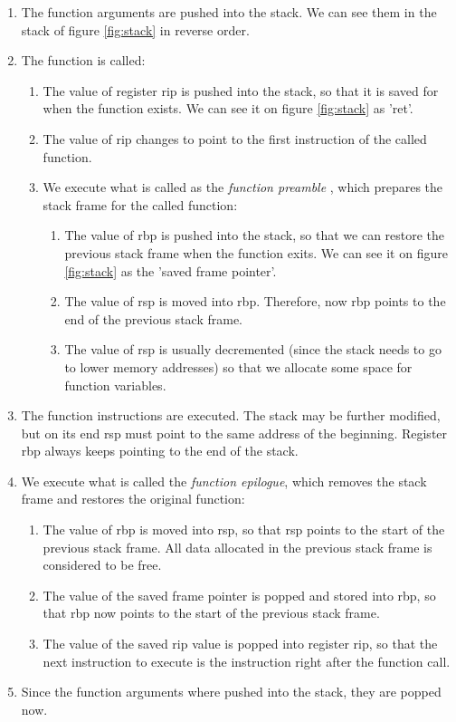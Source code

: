 \begin{enumerate}
\item The function arguments are pushed into the stack. We can see them in the stack of figure \ref{fig:stack} in reverse order. 
\item The function is called:
\begin{enumerate}
	\item The value of register rip is pushed into the stack, so that it is saved for when the function exists. We can see it on figure \ref{fig:stack} as 'ret'.
	\item The value of rip changes to point to the first instruction of the called function.
\item We execute what is called as the \textit{function preamble} \cite{8664_params_abi_p18}, which prepares the stack frame for the called function:
\begin{enumerate}
	\item The value of rbp is pushed into the stack, so that we can restore the previous stack frame when the function exits. We can see it on figure \ref{fig:stack} as the 'saved frame pointer'.
	\item The value of rsp is moved into rbp. Therefore, now rbp points to the end of the previous stack frame.
	\item The value of rsp is usually decremented (since the stack needs to go to lower memory addresses) so that we allocate some space for function variables.
\end{enumerate}
\end{enumerate}
\item The function instructions are executed. The stack may be further modified, but on its end rsp must point to the same address of the beginning. Register rbp always keeps pointing to the end of the stack.
\item We execute what is called the \textit{function epilogue}, which removes the stack frame and restores the original function:
\begin{enumerate}
	\item The value of rbp is moved into rsp, so that rsp points to the start of the previous stack frame. All data allocated in the previous stack frame is considered to be free.
	\item The value of the saved frame pointer is popped and stored into rbp, so that rbp now points to the start of the previous stack frame.
	\item The value of the saved rip value is popped into register rip, so that the next instruction to execute is the instruction right after the function call.
\end{enumerate}
\item Since the function arguments where pushed into the stack, they are popped now.
\end{enumerate}



